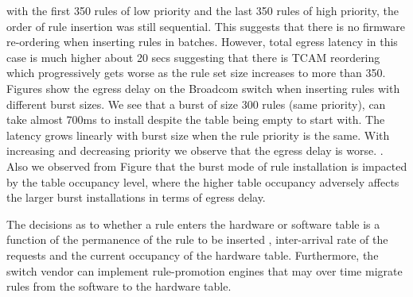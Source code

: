 with the first 350 rules of low priority and the last 350 rules of high priority, the order of rule insertion was still sequential. 
This suggests that there is no firmware re-ordering when inserting rules in batches. 
However, total egress latency in this case is much higher about 20 secs suggesting that there is TCAM reordering which progressively gets worse as the rule set size increases to more than 350. 
Figures  show the egress delay on the Broadcom switch when inserting rules with different burst sizes. We see that a burst of size 300 rules (same priority), can take almost 700ms to 
install despite the table being empty to start with. The latency grows linearly with burst size when the rule priority is the same. 
With increasing and decreasing priority we observe that the egress delay is worse. 
. 
Also we observed from Figure  that the burst mode of rule installation is impacted by the table occupancy level, 
where the higher table occupancy adversely affects the larger burst installations in terms of egress delay.  

The decisions as to whether a rule enters the hardware or software table is a function of the permanence of the rule to be inserted , 
inter-arrival rate of the \flowmod requests and the current occupancy of the hardware table. 
Furthermore, the switch vendor can implement rule-promotion engines that may over time migrate rules from the software to the hardware table.
\fi



